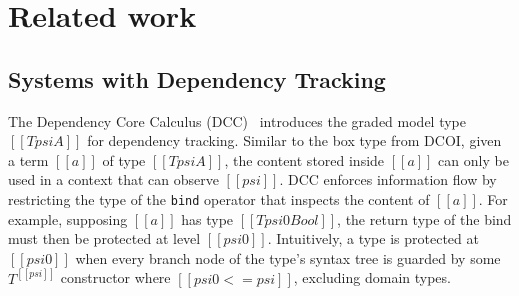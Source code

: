\documentclass[acmsmall]{acmart}
\newcommand{\jc}[1]{}
\newcommand{\name}{DCOI\xspace}
\begin{document}

\section{Related work}
\label{sec:related}

\subsection{Systems with Dependency Tracking}
The Dependency Core Calculus (DCC)~\citep{abadi1999core} introduces the
graded model type $[[T psi A]]$ for dependency tracking. Similar to the box
type from \name{}, given a term $[[a]]$ of type $[[T psi A]]$, the
content stored inside $[[a]]$ can only be used in a context that
can observe $[[psi]]$. DCC enforces
information flow by restricting the type of the \lstinline{bind}
operator that inspects the content of $[[a]]$. For example, supposing
$[[a]]$ has type $[[T psi0 Bool]]$, the return type of the bind
must then be protected at level $[[psi0]]$. Intuitively, a type is
protected at $[[psi0]]$ when every branch node of the type's syntax
tree is guarded by some $T^{[[psi]]}$ constructor where $[[psi0 <=
psi]]$, excluding domain types.
\end{document}
